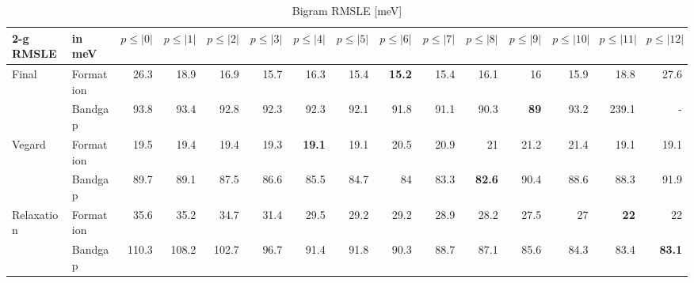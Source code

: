 \documentclass[11pt,oneside,czech,american]{book} %
\theoremstyle{definition} %
\theoremstyle{definition}
\begin{document}
\begin{table}[H]
	\scriptsize
	\centering
\begin{tabular}{llrrrrrrrrrrrrr}
	\hline
	2-g RMSLE   & in meV    &   $p{\leq}|0|$ &   $p{\leq}|1|$ &   $p{\leq}|2|$ &   $p{\leq}|3|$ &   $p{\leq}|4|$ &   $p{\leq}|5|$ &   $p{\leq}|6|$ &   $p{\leq}|7|$ &   $p{\leq}|8|$ &   $p{\leq}|9|$ &   $p{\leq}|10|$ &   $p{\leq}|11|$ &   $p{\leq}|12|$\\
	\hline
	\multirow{2}{*}{Final}       & Formation &       26.3 &       18.9 &       16.9 &       15.7 &       16.3 &       15.4 &       \textbf{15.2} &       15.4 &       16.1 &       16   &        15.9 &        18.8 &        27.6\\
	       & Bandgap   &       93.8 &       93.4 &       92.8 &       92.3 &       92.3 &       92.1 &       91.8 &       91.1 &       90.3 &       \textbf{89}   &        93.2 &       239.1 &       -\\
	\multirow{2}{*}{Vegard}      & Formation &       19.5 &       19.4 &       19.4 &       19.3 &       \textbf{19.1} &       19.1 &       20.5 &       20.9 &       21   &       21.2 &        21.4 &        19.1 &        19.1\\
	      & Bandgap   &       89.7 &       89.1 &       87.5 &       86.6 &       85.5 &       84.7 &       84  &       83.3 &       \textbf{82.6} &       90.4 &        88.6 &        88.3 &        91.9 \\
	\multirow{2}{*}{Relaxation}  & Formation &       35.6 &       35.2 &       34.7 &       31.4 &       29.5 &       29.2 &       29.2 &       28.9 &       28.2 &       27.5 &        27   &        \textbf{22}   &        22\\
	  & Bandgap   &      110.3 &      108.2 &      102.7 &       96.7 &       91.4 &       91.8 &       90.3 &       88.7 &       87.1 &       85.6 &        84.3 &        83.4 &        \textbf{83.1}\\
	\hline
\end{tabular}	
	\caption{Bigram RMSLE [meV]}
	\label{2-g RMSLE}
\end{table}
\end{document}
